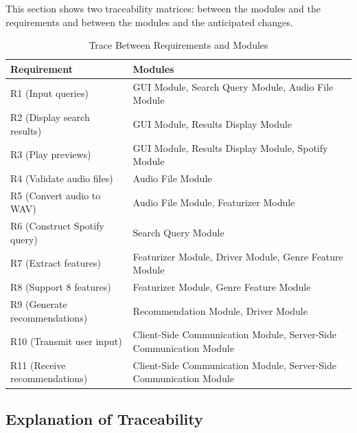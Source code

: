 \documentclass[12pt, titlepage]{article}
\begin{document}
This section shows two traceability matrices: between the modules and the
requirements and between the modules and the anticipated changes.

\begin{table}[H]
\centering
\begin{tabular}{p{} p{}}
\toprule
\textbf{Requirement} & \textbf{Modules}\\
\midrule
R1 (Input queries) & GUI Module, Search Query Module, Audio File Module \\
R2 (Display search results) & GUI Module, Results Display Module \\
R3 (Play previews) & GUI Module, Results Display Module, Spotify Module \\
R4 (Validate audio files) & Audio File Module \\
R5 (Convert audio to WAV) & Audio File Module, Featurizer Module \\
R6 (Construct Spotify query) & Search Query Module \\
R7 (Extract features) & Featurizer Module, Driver Module, Genre Feature Module \\
R8 (Support 8 features) & Featurizer Module, Genre Feature Module \\
R9 (Generate recommendations) & Recommendation Module, Driver Module \\
R10 (Transmit user input) & Client-Side Communication Module, Server-Side Communication Module \\
R11 (Receive recommendations) & Client-Side Communication Module, Server-Side Communication Module \\
\bottomrule
\end{tabular}
\caption{Trace Between Requirements and Modules}
\label{TblRT}
\end{table}

\subsection{Explanation of Traceability}
\end{document}
